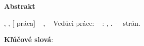 \thispagestyle{empty} %

\noindent\LARGE \textbf{Abstrakt}\\

\normalsize

\vspace{0.5cm}
{
	\setlength{\parindent}{0pt}

	\autormeno{},  
	\nazovprace{},  
	\ifdefempty{\podnazovprace}{}{%
		\podnazovprace{},
	}
	[\typprace{} práca] –  
	\nazovuniverzity{},  
	\nazovfakulty{} –  
	Vedúci práce: \veducimeno{} – 
	\nazovmesta{}: \skratkafakulty{} \skratkauniverzity{},
	\aktualnyrok{}. -
	\pageref{LastPage}~strán.
	
}

\vspace{0.5cm}

\abstraktslovencina{}

\vspace{0.5cm}

{
	\setlength{\parindent}{0pt}

	\textbf{Kľúčové slová}: \klucoveslovaslovencina{}
}
\vspace{0.5cm}

\newpage
